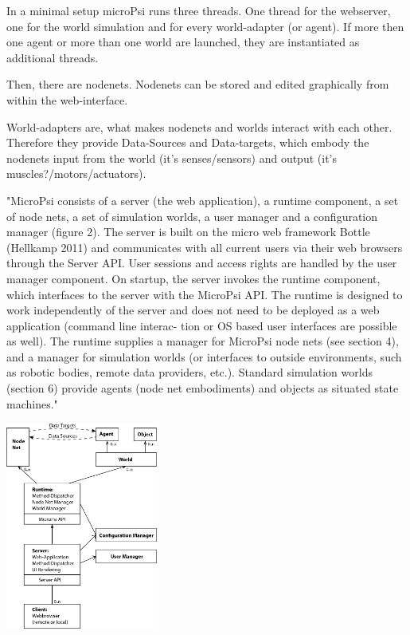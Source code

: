 In a minimal setup microPsi runs three threads. One thread for the webserver, one for the world simulation and for every world-adapter (or agent). If more then one agent or more than one world are launched, they are instantiated as additional threads.

Then, there are nodenets. Nodenets can be stored and edited graphically from within the web-interface.

World-adapters are, what makes nodenets and worlds interact with each other. Therefore they provide Data-Sources and Data-targets, which embody the nodenets input from the world (it's senses/sensors) and output (it's muscles?/motors/actuators).

"MicroPsi consists of a server (the web application), a runtime component, a set of node nets, a set of simulation worlds, a user manager and a configuration manager (figure 2). The server is built on the micro web framework Bottle (Hellkamp 2011) and communicates with all current users via their web browsers through the Server API. User sessions and access rights are handled by the user manager component.
On startup, the server invokes the runtime component, which interfaces to the server with the MicroPsi API. The runtime is designed to work independently of the server and does not need to be deployed as a web application (command line interac- tion or OS based user interfaces are possible as well).
The runtime supplies a manager for MicroPsi node nets (see section 4), and a manager for simulation worlds (or interfaces to outside environments, such as robotic bodies, remote data providers, etc.). Standard simulation worlds (section 6) provide agents (node net embodiments) and objects as situated state machines."~\cite{conf/agi/Bach12}

            \includegraphics[width=5cm]{graphics/micropsi2_uml}
            
